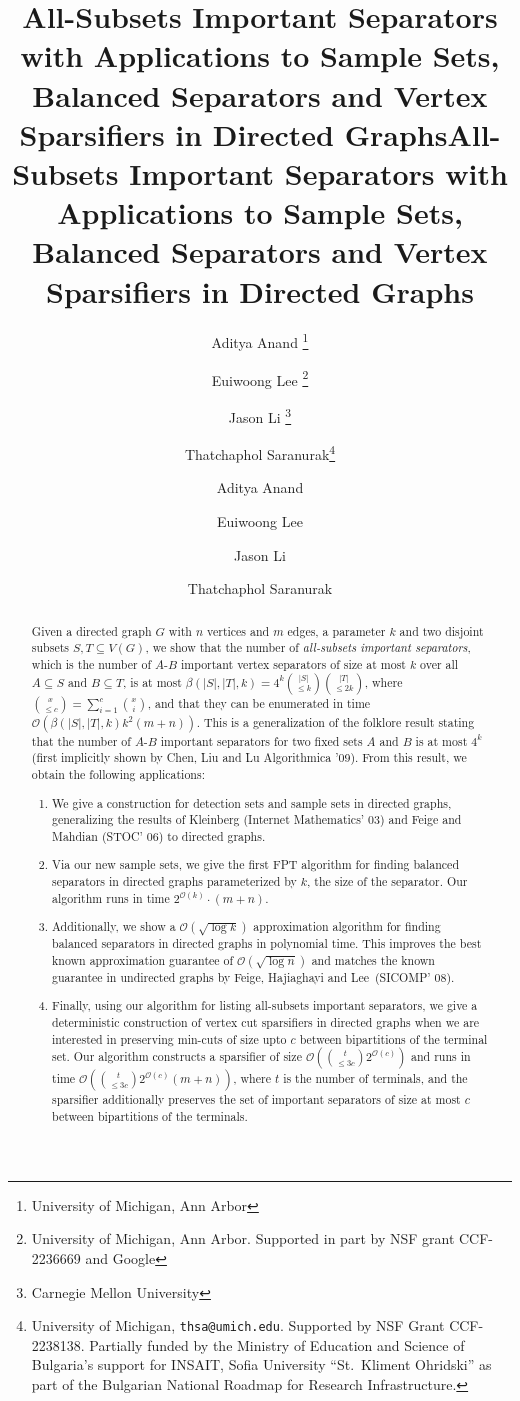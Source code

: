 \documentclass[11pt]{article}
\title{All-Subsets Important Separators with Applications to Sample Sets, Balanced Separators and Vertex Sparsifiers in Directed Graphs}
\author{ {Aditya Anand \thanks{University of Michigan, Ann Arbor} }\and {Euiwoong Lee \thanks{University of Michigan, Ann Arbor. Supported in part by NSF grant CCF-2236669 and Google}}
  \and {Jason Li \thanks{Carnegie Mellon University}}
  \and {Thatchaphol Saranurak\thanks{
        University of Michigan,
        \texttt{thsa@umich.edu}.
        Supported by NSF Grant CCF-2238138. Partially funded by the Ministry of Education and Science of Bulgaria's support for INSAIT, Sofia University ``St.~Kliment Ohridski'' as part of the Bulgarian National Roadmap for Research Infrastructure.
    }}}
\date{}
\title{All-Subsets Important Separators with Applications to Sample Sets, Balanced Separators and Vertex Sparsifiers in Directed Graphs}
\author{Aditya Anand}{University of Michigan Ann Arbor, USA}{adanand@umich.edu}{}{}
\author{Euiwoong Lee}{University of Michigan Ann Arbor, USA}{euiwoong@umich.edu}{}{}
\author{Jason Li}{Carnegie Mellon University, USA}{jmli@alumni.cmu.edu}{}{}
\author{Thatchaphol Saranurak}{University of Michigan Ann Arbor, USA}{thsa@umich.edu}{}{}
\newif\iflongversion
\newcommand{\lv}[1]{\iflongversion #1 \fi}  \newcommand{\sv}[1]{\iflongversion\else #1\fi}
\newcommand{\OO}{\mathcal{O}}
\begin{document}
\maketitle
{}

\begin{abstract}
Given a directed graph $G$ with $n$ vertices and $m$ edges, a parameter $k$ and two disjoint subsets $S,T \subseteq V(G)$, we show that the number of \emph{all-subsets important separators}, which is the number of $A$-$B$ important vertex separators of size at most $k$ over all $A \subseteq S$ and $B \subseteq T$, is at most $\beta(|S|, |T|, k) = 4^k {|S| \choose \leq k} {|T| \choose \leq 2k}$, where ${x \choose \leq c} = \sum_{i = 1}^c {x \choose i}$, and that they can be enumerated in time $\OO(\beta(|S|,|T|,k)k^2(m+n))$. This is a generalization of the folklore result stating that the number of $A$-$B$ important separators for two fixed sets $A$ and $B$ is at most $4^k$ (first implicitly shown by Chen, Liu and Lu Algorithmica '09). From this result, we obtain the following applications: 

\begin{enumerate}
    \item We give a construction for detection sets and sample sets in directed graphs, generalizing the results of Kleinberg (Internet Mathematics' 03) and Feige and Mahdian (STOC' 06) to directed graphs. 
    \item Via our new sample sets, we give the first FPT algorithm for finding balanced separators in directed graphs parameterized by $k$, the size of the separator. Our algorithm runs in time $2^{\OO(k)} \cdot (m + n)$. 
    \item Additionally, we show a $\OO(\sqrt{\log k})$ approximation algorithm for finding balanced separators in directed graphs in polynomial time. This improves the best known approximation guarantee of $\OO(\sqrt{\log n})$ and matches the known guarantee in undirected graphs by Feige, Hajiaghayi and Lee~(SICOMP' 08).
    \item Finally, using our algorithm for listing all-subsets important separators, we give a deterministic construction of vertex cut sparsifiers in directed graphs when we are interested in preserving min-cuts of size upto $c$ between bipartitions of the terminal set. Our algorithm constructs a sparsifier of size $\OO\left({t \choose \leq 3c}2^{\OO(c)}\right)$ and runs in time $\OO\left({t \choose \leq 3c} 2^{\OO(c)}(m + n)\right)$, where $t$ is the number of terminals, and the sparsifier additionally preserves the set of important separators of size at most $c$ between bipartitions of the terminals.
\end{enumerate}



\end{abstract}
 \lv{
\newpage
\tableofcontents
\newpage
}
\end{document}
